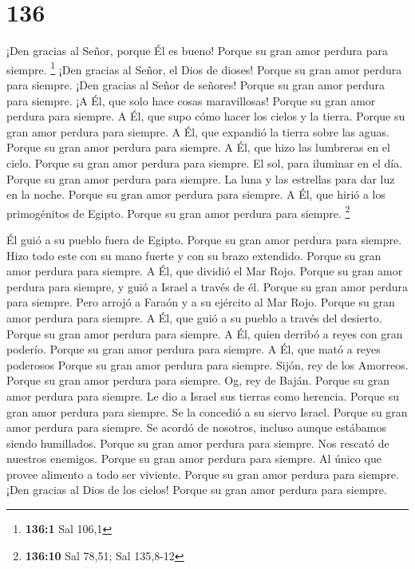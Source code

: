 \hypertarget{section-135}{%
\section{136}\label{section-135}}

 ¡Den gracias al Señor, porque Él es bueno! Porque su gran
amor perdura para siempre. \footnote{\textbf{136:1} Sal 106,1}
 ¡Den gracias al Señor, el Dios de dioses! Porque su gran
amor perdura para siempre.  ¡Den gracias al Señor de
señores! Porque su gran amor perdura para siempre.  ¡A Él,
que solo hace cosas maravillosas! Porque su gran amor perdura para
siempre.  A Él, que supo cómo hacer los cielos y la tierra.
Porque su gran amor perdura para siempre.  A Él, que
expandió la tierra sobre las aguas. Porque su gran amor perdura para
siempre.  A Él, que hizo las lumbreras en el cielo. Porque
su gran amor perdura para siempre.  El sol, para iluminar en
el día. Porque su gran amor perdura para siempre.  La luna y
las estrellas para dar luz en la noche. Porque su gran amor perdura para
siempre.  A Él, que hirió a los primogénitos de Egipto.
Porque su gran amor perdura para siempre. \footnote{\textbf{136:10} Sal
  78,51; Sal 135,8-12}

 Él guió a su pueblo fuera de Egipto. Porque su gran amor
perdura para siempre.  Hizo todo este con su mano fuerte y
con su brazo extendido. Porque su gran amor perdura para siempre.
 A Él, que dividió el Mar Rojo. Porque su gran amor perdura
para siempre,  y guió a Israel a través de él. Porque su
gran amor perdura para siempre.  Pero arrojó a Faraón y a
su ejército al Mar Rojo. Porque su gran amor perdura para siempre.
 A Él, que guió a su pueblo a través del desierto. Porque
su gran amor perdura para siempre.  A Él, quien derribó a
reyes con gran poderío. Porque su gran amor perdura para siempre.
 A Él, que mató a reyes poderosos Porque su gran amor
perdura para siempre.  Sijón, rey de los Amorreos. Porque
su gran amor perdura para siempre.  Og, rey de Baján.
Porque su gran amor perdura para siempre.  Le dio a Israel
sus tierras como herencia. Porque su gran amor perdura para siempre.
 Se la concedió a su siervo Israel. Porque su gran amor
perdura para siempre.  Se acordó de nosotros, incluso
aunque estábamos siendo humillados. Porque su gran amor perdura para
siempre.  Nos rescató de nuestros enemigos. Porque su gran
amor perdura para siempre.  Al único que provee alimento a
todo ser viviente. Porque su gran amor perdura para siempre.
 ¡Den gracias al Dios de los cielos! Porque su gran amor
perdura para siempre.

